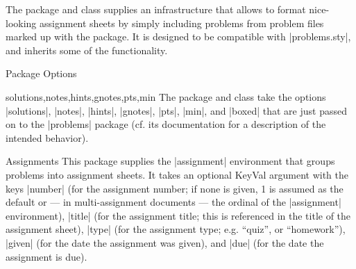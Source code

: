 
The  package and class supplies an infrastructure that allows to format
nice-looking assignment sheets by simply including problems from problem files marked up
with the  package.  It is designed to be compatible with |problems.sty|, and
inherits some of the functionality.

\begin{sfragment}[id=sec:user:options]{Package Options}

\begin{variable}{solutions,notes,hints,gnotes,pts,min}
The  package and class take the options |solutions|, |notes|, |hints|,
|gnotes|, |pts|, |min|, and |boxed| that are just passed on to the |problems| package
(cf. its documentation for a description of the intended behavior).
\end{variable}
\end{sfragment}

\begin{sfragment}{Assignments}
This package supplies the |assignment| environment that groups
problems into assignment sheets. It takes an optional KeyVal argument with the keys
|number| (for the assignment number; if none is given, 1 is
assumed as the default or --- in multi-assignment documents --- the ordinal of the
|assignment| environment), |title| (for the assignment title; this
is referenced in the title of the assignment sheet), |type| (for the
assignment type; e.g. ``quiz'', or ``homework''), |given| (for the
date the assignment was given), and |due| (for the date the
assignment is due).
\end{sfragment}

